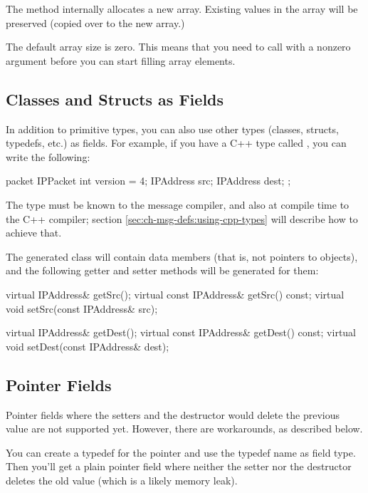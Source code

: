 The  method internally allocates a new array. Existing
values in the array will be preserved (copied over to the new array.)

The default array size is zero. This means that you need to call
 with a nonzero argument before you can
start filling array elements.


\subsection{Classes and Structs as Fields}
\label{sec:ch-msg-defs:other-types-as-fields}

In addition to primitive types, you can also use other types (classes,
structs, typedefs, etc.) as fields. For example, if you have a C++ type
called , you can write the following:

\begin{msg}
packet IPPacket
{
    int version = 4;
    IPAddress src;
    IPAddress dest;
};
\end{msg}

The  type must be known to the message compiler, and
also at compile time to the C++ compiler; section
\ref{sec:ch-msg-defs:using-cpp-types} will describe how to achieve that.

The generated class will contain  data members
(that is, not pointers to  objects), and
the following getter and setter methods will be generated for them:

\begin{cpp}
virtual IPAddress& getSrc();
virtual const IPAddress& getSrc() const;
virtual void setSrc(const IPAddress& src);

virtual IPAddress& getDest();
virtual const IPAddress& getDest() const;
virtual void setDest(const IPAddress& dest);
\end{cpp}


\subsection{Pointer Fields}
\label{sec:ch-msg-defs:pointers-fields}

Pointer fields where the setters and the destructor would delete the
previous value are not supported yet. However, there are workarounds, as
described below.

You can create a typedef for the pointer and use the typedef name as field
type. Then you'll get a plain pointer field where neither the setter nor
the destructor deletes the old value (which is a likely memory leak).

